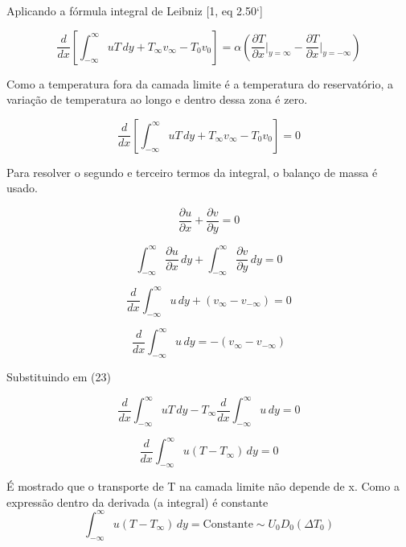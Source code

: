\documentclass[12pt]{article}
\begin{document}
Aplicando a fórmula integral de Leibniz [1, eq 2.50`]

\begin{equation}
	\frac{d}{dx} \left[ \int_{-\infty}^{\infty} u T \, dy + T_\infty v_\infty - T_0 v_0 \right] = \alpha \left( \frac{\partial T}{\partial x} \bigg|_{y=\infty} - \frac{\partial T}{\partial x} \bigg|_{y=-\infty} \right)
\end{equation}

Como a temperatura fora da camada limite é a temperatura do reservatório, a variação de temperatura ao longo e dentro dessa zona é zero.

\begin{equation}
	\frac{d}{dx} \left[ \int_{-\infty}^{\infty} u T \, dy + T_\infty v_\infty - T_0 v_0 \right] = 0
\end{equation}

Para resolver o segundo e terceiro termos da integral, o balanço de massa é usado.

\begin{equation}
	\frac{\partial u}{\partial x} + \frac{\partial v}{\partial y} = 0
\end{equation}

\begin{equation}
	\int_{-\infty}^{\infty} \frac{\partial u}{\partial x} \, dy + \int_{-\infty}^{\infty} \frac{\partial v}{\partial y} \, dy = 0
\end{equation}

\begin{equation}
	\frac{d}{dx} \int_{-\infty}^{\infty} u \, dy + (v_\infty - v_{-\infty}) = 0
\end{equation}

\begin{equation}
	\frac{d}{dx} \int_{-\infty}^{\infty} u \, dy = -(v_\infty - v_{-\infty}) 
\end{equation}

Substituindo em (23)

\begin{equation}
	\frac{d}{dx} \int_{-\infty}^{\infty} u T \, dy - T_\infty \frac{d}{dx} \int_{-\infty}^{\infty} u \, dy = 0
\end{equation}

\begin{equation}
	\frac{d}{dx} \int_{-\infty}^{\infty} u (T - T_\infty) \, dy = 0
\end{equation}

É mostrado que o transporte de T na camada limite não depende de x. Como a expressão dentro da derivada (a integral) é constante
\begin{equation}
	\int_{-\infty}^{\infty} u (T - T_\infty) \, dy = \text{Constante} \sim  U_0 D_0 (\Delta T_{0})
\end{equation}
\end{document}
